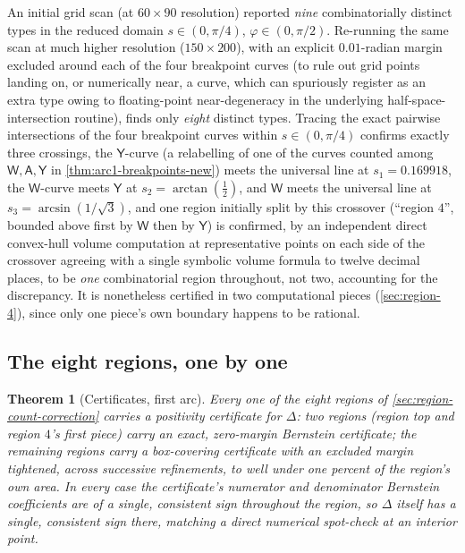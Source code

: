 \documentclass[11pt,reqno]{amsart}
\renewcommand{\_}{\origunderscore\allowbreak}
\numberwithin{equation}{section}
\theoremstyle{plain}
\newtheorem{thm}{Theorem}[section]
\theoremstyle{definition}
\theoremstyle{remark}
\newcommand{\tilt}{\varphi}                  %
\newcommand{\arcp}{s}                        %
\newcommand{\defect}{\Delta}                 %
\begin{document}
An initial grid scan (at $60\times90$ resolution) reported \emph{nine}
combinatorially distinct types in the reduced domain
$\arcp\in(0,\pi/4)$, $\tilt\in(0,\pi/2)$. Re-running the same scan at
much higher resolution ($150\times200$), with an explicit $0.01$-radian
margin excluded around each of the four breakpoint curves (to rule out
grid points landing on, or numerically near, a curve, which can
spuriously register as an extra type owing to floating-point
near-degeneracy in the underlying half-space-intersection routine),
finds only \emph{eight} distinct types. Tracing the exact pairwise
intersections of the four breakpoint curves within $\arcp\in(0,\pi/4)$
confirms exactly three crossings, the $\mathsf Y$-curve (a relabelling
of one of the curves counted among $\mathsf W,\mathsf A,\mathsf Y$ in
\cref{thm:arc1-breakpoints-new}) meets the universal line at
$\arcp_1=0.169918$, the $\mathsf W$-curve meets $\mathsf Y$ at
$\arcp_2=\arctan(\tfrac12)$, and $\mathsf W$ meets the universal line
at $\arcp_3=\arcsin(1/\sqrt3)$, and one region initially split by this
crossover (``region $4$'', bounded above first by $\mathsf W$ then by
$\mathsf Y$) is confirmed, by an independent direct convex-hull volume
computation at representative points on each side of the crossover
agreeing with a single symbolic volume formula to twelve decimal
places, to be \emph{one} combinatorial region throughout, not two, 
accounting for the discrepancy. It is nonetheless certified in two
computational pieces (\cref{sec:region-4}), since only one piece's own
boundary happens to be rational.

\subsection{The eight regions, one by one}

\begin{thm}[Certificates, first arc]\label{thm:arc1-certs-new}
Every one of the eight regions of \cref{sec:region-count-correction}
carries a positivity certificate for $\defect$: two regions (region
top and region $4$'s first piece) carry an exact, zero-margin Bernstein
certificate; the remaining regions carry a box-covering certificate
with an excluded margin tightened, across successive refinements, to
well under one percent of the region's own area. In every case the
certificate's numerator and denominator Bernstein coefficients are of a
single, consistent sign throughout the region, so $\defect$ itself has
a single, consistent sign there, matching a direct numerical
spot-check at an interior point.
\end{thm}
\end{document}
